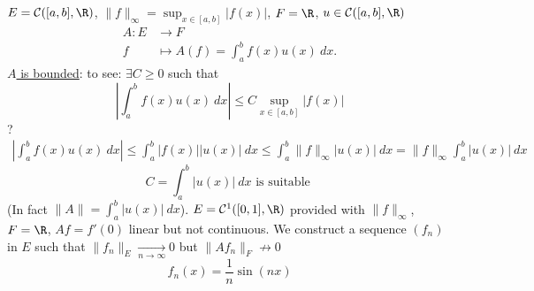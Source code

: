 \begin{eg}
    $E = \mathcal{C}([a, b], \R)$, $\|f\|_{\infty} = \sup_{x \in [a, b]} |f(x)|$, $F = \R$, $u \in \mathcal{C}([a, b], \R)$
    \begin{align*}
        A: E &\longrightarrow F \\
        f &\longmapsto A(f) = \int_{{a}}^{{b}} {f(x)u(x)} \: d{x} {}
    .\end{align*}
    \underline{$A$ is bounded}: to see: $\exists C \ge 0$ such that
    \[
        \left| \int_{{a}}^{{b}} {f(x)u(x)} \: d{x} {} \right| \le C \sup_{x \in [a, b]} |f(x)|
    \] 
    ?
    \begin{align*}
        \left| \int_{{a}}^{{b}} {f(x)u(x)} \: d{x} {} \right| \le \int_{{a}}^{{b}} {|f(x)| |u(x)|} \: d{x} {} \le \int_{{a}}^{{b}} {\|f\|_{\infty}|u(x)|} \: d{x} {= \|f\|_{\infty} \int_{{a}}^{{b}} {|u(x)|} \: d{x} {}}
    \end{align*}
    \[
    C = \int_{{a}}^{{b}} {|u(x)|} \: d{x} \text{ is suitable }
    \] 
    (In fact $\|A\| = \int_{{a}}^{{b}} {|u(x)|} \: d{x} {}$). $E = \mathcal{C}^1([0,1], \R)$ provided with $\|f\|_{\infty}$, $F = \R$, $Af = f'(0)$ linear but not continuous. We construct a sequence $(f_n)$ in $E$ such that $\|f_n\|_E \xrightarrow[n \to \infty]{} 0$ but $\|Af_n\|_F \not\to 0$
    \[
    f_n(x) = \frac{1}{n}\sin(nx)
    \] 
\end{eg}
